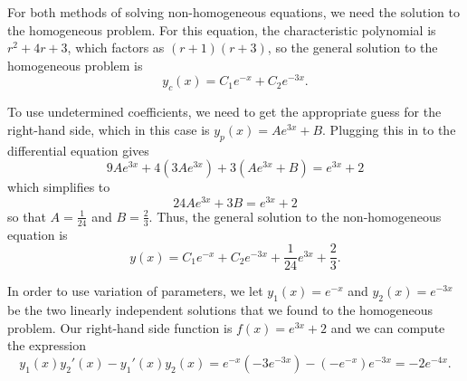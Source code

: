 \documentclass{ximera}
\begin{document}
\begin{exampleSol}
    For both methods of solving non-homogeneous equations, we need the solution to the homogeneous problem. For this equation, the characteristic polynomial is $r^2 + 4r + 3$, which factors as $(r+1)(r+3)$, so the general solution to the homogeneous problem is
    \begin{equation*}
        y_c(x) = C_1 e^{-x} + C_2e^{-3x}.
    \end{equation*}
    
    To use undetermined coefficients, we need to get the appropriate guess for the right-hand side, which in this case is $y_p(x) = Ae^{3x} + B$. Plugging this in to the differential equation gives
    \begin{equation*}
        9Ae^{3x} + 4(3Ae^{3x}) + 3(Ae^{3x} + B) = e^{3x} + 2
    \end{equation*}
    which simplifies to
    \begin{equation*}
        24Ae^{3x} + 3B = e^{3x} + 2
    \end{equation*}
    so that $A = \frac{1}{24}$ and $B = \frac{2}{3}$. Thus, the general solution to the non-homogeneous equation is
    \begin{equation*}
        y(x) = C_1e^{-x} + C_2e^{-3x} + \frac{1}{24}e^{3x} + \frac{2}{3}.
    \end{equation*}
    
    In order to use variation of parameters, we let $y_1(x) = e^{-x}$ and $y_2(x) = e^{-3x}$ be the two linearly independent solutions that we found to the homogeneous problem. Our right-hand side function is $f(x) = e^{3x} + 2$ and we can compute the expression
    \begin{equation*}
        y_1(x)y_2'(x) - y_1'(x)y_2(x) = e^{-x}(-3e^{-3x}) - (-e^{-x})e^{-3x} = -2e^{-4x}.
    \end{equation*}
    

\end{exampleSol}
\end{document}
